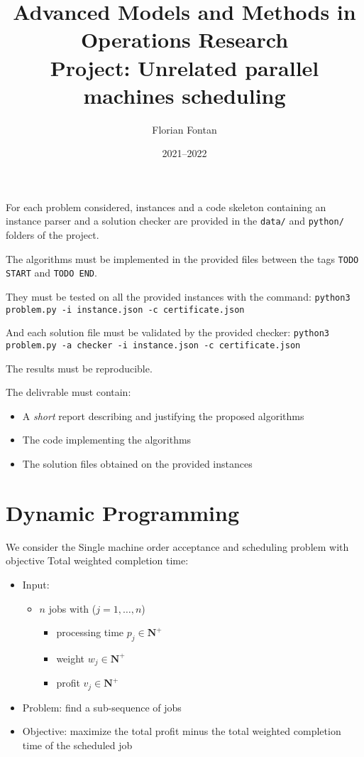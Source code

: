 \documentclass[a4paper,twocolumn]{article}
\author{Florian Fontan}
\title{Advanced Models and Methods in Operations Research \\ Project: Unrelated parallel machines scheduling}
\date{2021--2022}
\newcommand{\N}{\mathbf{N}}
\begin{document}
\maketitle

For each problem considered, instances and a code skeleton containing an instance parser and a solution checker are provided in the \texttt{data/} and \texttt{python/} folders of the project.

The algorithms must be implemented in the provided files between the tags \texttt{TODO START} and \texttt{TODO END}.

They must be tested on all the provided instances with the command:
\texttt{python3 problem.py -i instance.json -c certificate.json}

And each solution file must be validated by the provided checker:
\texttt{python3 problem.py -a checker -i instance.json -c certificate.json}

The results must be reproducible.

\bigskip

The delivrable must contain:
\begin{itemize}
  \item A \emph{short} report describing and justifying the proposed algorithms
  \item The code implementing the algorithms
  \item The solution files obtained on the provided instances
\end{itemize}

\section{Dynamic Programming}

We consider the Single machine order acceptance and scheduling problem with objective Total weighted completion time:
\begin{itemize}
  \item Input:
    \begin{itemize}
      \item $n$ jobs with ($j = 1, \dots, n$)
        \begin{itemize}
          \item processing time $p_j \in \N^+$
          \item weight $w_j \in \N^+$
          \item profit $v_j \in \N^+$
        \end{itemize}
    \end{itemize}
  \item Problem: find a sub-sequence of jobs
  \item Objective: maximize the total profit minus the total weighted completion time of the scheduled job
\end{itemize}
\end{document}
